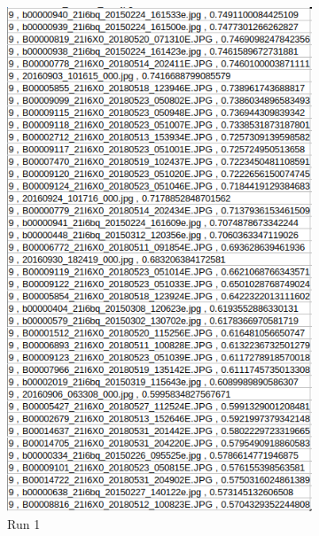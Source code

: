 \begin{figure}[H]
  \centering
  \captionsetup{justification=centering}

  \begin{subfigure}{0.4\textwidth}
  \includegraphics[width=\textwidth]{Sections/7Results/images/topic9_results.png} 
  \caption{Run 1}
  \end{subfigure}
  \hspace{+5mm}
  \begin{subfigure}{0.385\textwidth}

\end{subfigure}
\end{figure}
